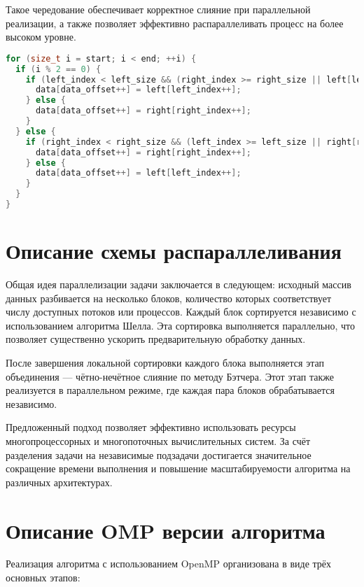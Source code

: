 \documentclass[a4paper,12pt]{article}
\begin{document}
Такое чередование обеспечивает корректное слияние при параллельной реализации, а также позволяет эффективно распараллеливать процесс на более высоком уровне.
\vspace{0.5em}
\begin{lstlisting}[language=C++,caption={Основной цикл слияния в BatcherMerge}]
for (size_t i = start; i < end; ++i) {
  if (i % 2 == 0) {
    if (left_index < left_size && (right_index >= right_size || left[left_index] <= right[right_index])) {
      data[data_offset++] = left[left_index++];
    } else {
      data[data_offset++] = right[right_index++];
    }
  } else {
    if (right_index < right_size && (left_index >= left_size || right[right_index] <= left[left_index])) {
      data[data_offset++] = right[right_index++];
    } else {
      data[data_offset++] = left[left_index++];
    }
  }
}
\end{lstlisting}
\vspace{1em}
\newpage

\section{Описание схемы распараллеливания}
Общая идея параллелизации задачи заключается в следующем: исходный массив данных разбивается на несколько блоков, количество которых соответствует числу доступных потоков или процессов. Каждый блок сортируется независимо с использованием алгоритма Шелла. Эта сортировка выполняется параллельно, что позволяет существенно ускорить предварительную обработку данных.

После завершения локальной сортировки каждого блока выполняется этап объединения — чётно-нечётное слияние по методу Бэтчера. Этот этап также реализуется в параллельном режиме, где каждая пара блоков обрабатывается независимо.

Предложенный подход позволяет эффективно использовать ресурсы многопроцессорных и многопоточных вычислительных систем. За счёт разделения задачи на независимые подзадачи достигается значительное сокращение времени выполнения и повышение масштабируемости алгоритма на различных архитектурах.
\newpage

\section{Описание OMP версии алгоритма}
Реализация алгоритма с использованием OpenMP организована в виде трёх основных этапов:
\end{document}
